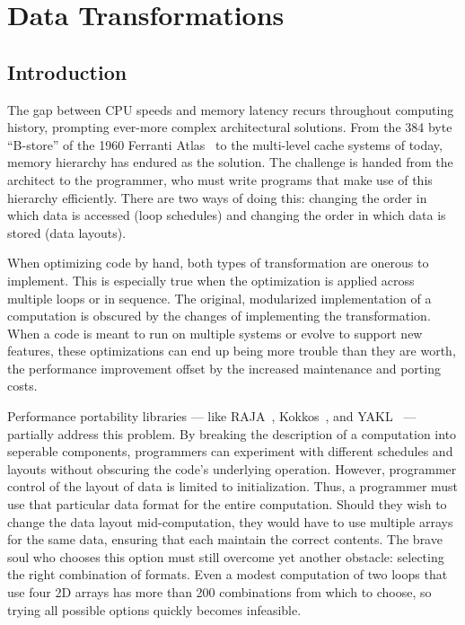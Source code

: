 
\chapter{Data Transformations}
\label{chap:FormatDecisions}

\def\@textbottom{\vskip \z@ \@plus 1pt}

\section{Introduction}

The gap between CPU speeds and memory latency recurs throughout computing history, prompting ever-more complex architectural solutions.
From the 384 byte ``B-store'' of the 1960 Ferranti Atlas~\cite{ferranti1960features} to the multi-level cache systems of today, memory hierarchy has endured as the solution.
The challenge is handed from the architect to the programmer, who must write programs that make use of this hierarchy efficiently.
There are two ways of doing this: changing the order in which data is accessed (loop schedules) and changing the order in which data is stored (data layouts).

When optimizing code by hand, both types of transformation are onerous to implement. 
This is especially true when the optimization is applied across multiple loops or in sequence.
The original, modularized implementation of a computation is obscured by the changes of implementing the transformation. 
When a code is meant to run on multiple systems or evolve to support new features, these optimizations can end up being more trouble than they are worth, the performance improvement offset by the increased maintenance and porting costs.

Performance portability libraries --- like RAJA~\cite{hornung2014RAJA}, Kokkos~\cite{edwards2014kokkos}, and YAKL~\cite{norman2022portable} --- partially address this problem.
By breaking the description of a computation into seperable components, programmers can experiment with different schedules and layouts without obscuring the code's underlying operation.
However, programmer control of the layout of data is limited to initialization. 
Thus, a programmer must use that particular data format for the entire computation.
Should they wish to change the data layout mid-computation, they would have to use multiple arrays for the same data, ensuring that each maintain the correct contents.
The brave soul who chooses this option must still overcome yet another obstacle: selecting the right combination of formats.
Even a modest computation of two loops that use four 2D arrays has more than 200 combinations from which to choose, so trying all possible options quickly becomes infeasible. 

